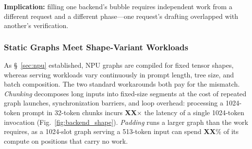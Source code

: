 \documentclass[sigconf,nonacm,10pt]{acmart}
\begin{document}
\noindent\textbf{Implication:} filling one backend's bubble requires independent work from a different request and a different phase---one request's drafting overlapped with another's verification.

\subsubsection{Static Graphs Meet Shape-Variant Workloads} \label{sec:motivation_qnn}
As \S~\ref{sec:npu} established, NPU graphs are compiled for fixed tensor shapes, whereas serving workloads vary continuously in prompt length, tree size, and batch composition. The two standard workarounds both pay for the mismatch. \emph{Chunking} decomposes long inputs into fixed-size segments at the cost of repeated graph launches, synchronization barriers, and loop overhead: processing a 1024-token prompt in 32-token chunks incurs {\color{red}\textbf{XX}$\times$} the latency of a single 1024-token invocation (Fig.~\ref{fig:backend_shape}). \emph{Padding} runs a larger graph than the work requires, as a 1024-slot graph serving a 513-token input can spend {\color{red}\textbf{XX}\%} of its compute on positions that carry no work. 
\end{document}
